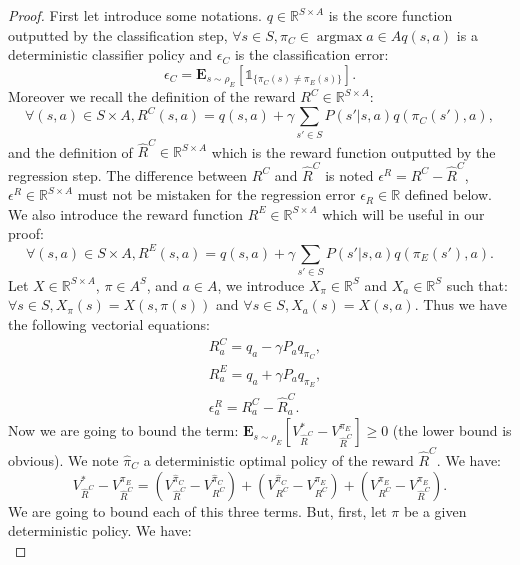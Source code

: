 \documentclass[smallextended]{svjour3}
\newcommand{\E}{\mathbf{E}}
\newcommand{\argmax}{\operatorname*{argmax}} %
\begin{document}
\begin{proof}
First let introduce some notations. $q\in\mathbb{R}^{S\times A}$ is the score function outputted by the classification step, $\forall s \in S,\pi_C\in\argmax{a\in A}q(s,a)$ is a deterministic classifier policy and $\epsilon_C$ is the classification error:
\begin{equation}
\epsilon_C=\E_{s\sim\rho_E}[\mathds{1}_{\{\pi_C(s)\neq\pi_E(s)\}}].
\end{equation}
Moreover we recall the definition of the reward $R^C\in\mathbb{R}^{S\times A}$:
\begin{equation}
\forall (s,a)\in S\times A, R^C(s,a)=q(s,a) +\gamma\sum_{s'\in S}P(s'|s,a)q(\pi_C(s'),a),
\end{equation}
and the definition of $\hat{R}^C\in\mathbb{R}^{S\times A}$ which is the reward function outputted by the regression step.
The difference between $R^C$ and $\hat{R}^C$ is noted $\epsilon^R=R^C-\hat{R}^C$, $\epsilon^R\in\mathbb{R}^{S\times A}$ must not be mistaken for the regression error $\epsilon_R\in\mathbb{R}$ defined below.
We also introduce the reward function $R^E\in\mathbb{R}^{S\times A}$ which will be useful in our proof:
\begin{equation}
\forall (s,a)\in S\times A, R^E(s,a)=q(s,a) +\gamma\sum_{s'\in S}P(s'|s,a)q(\pi_E(s'),a).
\end{equation}
Let $X\in\mathbb{R}^{S\times A}$, $\pi\in A^S$, and $a\in A$, we introduce $X_\pi\in\mathbb{R}^S$ and $X_a\in\mathbb{R}^S$ such that: $\forall s\in S, X_\pi(s)=X(s,\pi(s))$ and $\forall s\in S, X_a(s)=X(s,a)$.
Thus we have the following vectorial equations:
\begin{align}
&R^C_a=q_a-\gamma P_aq_{\pi_C},
\\
&R^E_a=q_a+\gamma P_aq_{\pi_E},
\\
&\epsilon^R_a=R^C_a-\hat{R}^C_a.
\end{align}
Now we are going to bound the term: $\E_{s\sim\rho_E}[V^*_{\hat{R}^C}-V^{\pi_E}_{\hat{R}^C}]\geq0$ (the lower bound is obvious).
We note $\hat{\pi}_C$ a deterministic optimal policy of the reward $\hat{R}^C$. We have:
\begin{equation}
V^*_{\hat{R}^C}-V^{\pi_E}_{\hat{R}^C}=(V^{\hat{\pi}_C}_{\hat{R}^C}-V^{\hat{\pi}_C}_{R^C})+(V^{\hat{\pi}_C}_{R^C}-V^{\pi_E}_{R^C})+(V^{\pi_E}_{R^C}-V^{\pi_E}_{\hat{R}^C}).
\end{equation}
We are going to bound each of this three terms. But, first, let $\pi$ be a given deterministic policy. We have:
\begin{equation}

\end{equation}
\end{proof}
\end{document}
